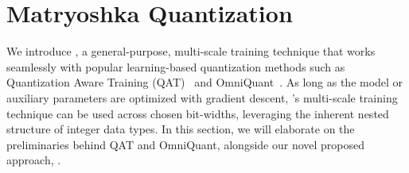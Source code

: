 \section{Matryoshka Quantization}
\label{sec:method}

We introduce \alg, a general-purpose, multi-scale training technique that works seamlessly with popular learning-based quantization methods such as Quantization Aware Training (QAT)~\citep{jacob2018quantization} and OmniQuant~\citep{shao2023omniquant}. As long as the model or auxiliary parameters are optimized with gradient descent, \alg's multi-scale training technique can be used across chosen bit-widths, leveraging the inherent nested structure of integer data types. In this section, we will elaborate on the preliminaries behind QAT and OmniQuant, alongside our novel proposed approach, \alg.




